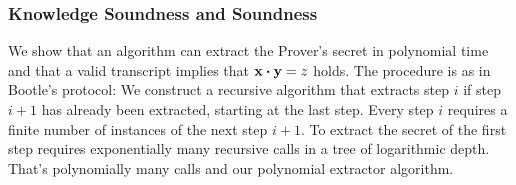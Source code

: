 \subsubsection{Knowledge Soundness and Soundness}

We show that an algorithm can extract the Prover's secret in polynomial time
and that a valid transcript implies that $\mathbf{x} \boldsymbol{\cdot} \mathbf{y} = z$ holds.
%
The procedure is as in Bootle's protocol:
We construct a recursive algorithm that extracts step $i$ if step $i + 1$ has already been extracted,
starting at the last step.
Every step $i$ requires a finite number of instances of the next step $i + 1$.
To extract the secret of the first step requires exponentially many recursive calls in a tree of logarithmic depth.
That's polynomially many calls and our polynomial extractor algorithm.

